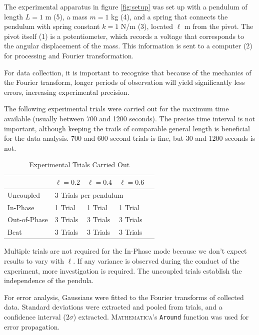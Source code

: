 \documentclass[aps,prl,reprint,10pt,amsmath,amssymb,superscriptaddress,a4paper, floatfix]{revtex4-2}
\begin{document}
The experimental apparatus in figure \ref{fig:setup} was set up with a pendulum of length $L = 1$ m (5), a mass $m = 1$ kg (4), and a spring that connects the pendulum with spring constant $k = 1$ N/m (3), located $\ell$ m from the pivot. The pivot itself (1) is a potentiometer, which records a voltage that corresponds to the angular displacement of the mass. This information is sent to a computer (2) for processing and Fourier transformation.

For data collection, it is important to recognise that because of the mechanics of the Fourier transform, longer periods of observation will yield significantly less errors, increasing experimental precision.

The following experimental trials were carried out for the maximum time available (usually between 700 and 1200 seconds). The precise time interval is not important, although keeping the trails of comparable general length is beneficial for the data analysis. 700 and 600 second trials is fine, but 30 and 1200 seconds is not.

\begin{table}[]
\begin{tabular}{@{}lllll@{}}
\toprule
             & $\ell = 0.2$       & $\ell = 0.4$      & $\ell = 0.6$      &  \\ \midrule
Uncoupled    & \multicolumn{3}{l}{3 Trials per   pendulum} &  \\
In-Phase     & 1 Trial       & 1 Trial      & 1 Trial      &  \\
Out-of-Phase & 3 Trials      & 3 Trials     & 3 Trials     &  \\
Beat         & 3 Trials      & 3 Trials     & 3 Trials     &  \\ \bottomrule
\end{tabular}
\caption{Experimental Trials Carried Out}
\end{table}

Multiple trials are not required for the In-Phase mode because we don’t expect results to vary with $\ell$. If any variance is observed during the conduct of the experiment, more investigation is required. The uncoupled trials establish the independence of the pendula.

For error analysis, Gaussians were fitted to the Fourier transforms of collected data. Standard deviations were extracted and pooled from trials, and a confidence interval ($2 \sigma$) extracted. \textsc{Mathematica}’s \texttt{Around} function was used for error propagation.
\end{document}
